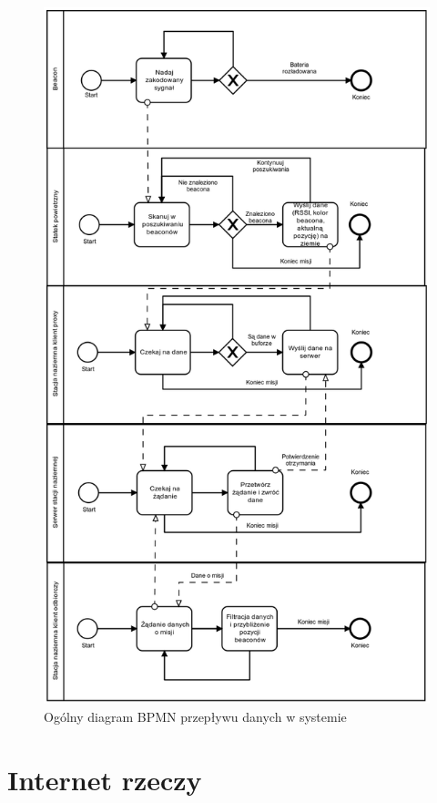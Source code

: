 \begin{figure}[!th]
    \centering
    \includegraphics[width=12.8cm]{zalaczniki/obrazy/diagram_ogolny.png}
    \caption{Ogólny diagram BPMN przepływu danych w systemie}
    \label{fig:diagramogolny}
\end{figure}

\section{Internet rzeczy}

